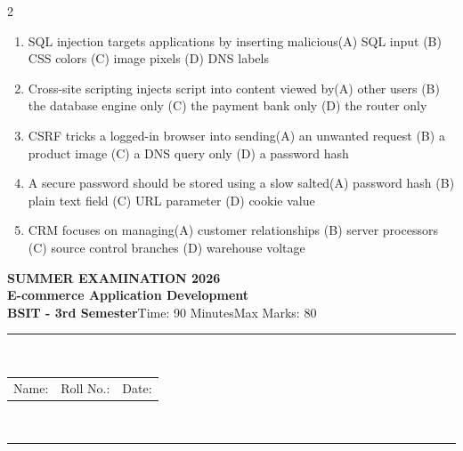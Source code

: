 \documentclass[a4paper]{article}
\makeatletter
\newcommand{\examheader}{%
\begin{center}\textbf{\large SUMMER EXAMINATION 2026}\\[-1pt]
\textbf{\normalsize E-commerce Application Development}\\[-1pt]
\textbf{BSIT - 3rd Semester}\quad Time: 90 Minutes\quad Max Marks: 80\\[-1pt]
\textcolor{black!65}{\rule{\linewidth}{0.45pt}}\\[-2pt]
\begin{tabularx}{\linewidth}{@{}X X X@{}}Name: \hrulefill & Roll No.: \hrulefill & Date: \hrulefill\end{tabularx}\\[-1pt]
\textcolor{black!65}{\rule{\linewidth}{0.45pt}}\end{center}}
\makeatother
\begin{document}
\begin{multicols*}{2}
\begin{enumerate}
\item SQL injection targets applications by inserting malicious\newline\hspace*{0.6em}(A) SQL input \quad (B) CSS colors \newline\hspace*{0.6em}(C) image pixels \quad (D) DNS labels
\item Cross-site scripting injects script into content viewed by\newline\hspace*{0.6em}(A) other users \quad (B) the database engine only \newline\hspace*{0.6em}(C) the payment bank only \quad (D) the router only
\item CSRF tricks a logged-in browser into sending\newline\hspace*{0.6em}(A) an unwanted request \quad (B) a product image \newline\hspace*{0.6em}(C) a DNS query only \quad (D) a password hash
\item A secure password should be stored using a slow salted\newline\hspace*{0.6em}(A) password hash \quad (B) plain text field \newline\hspace*{0.6em}(C) URL parameter \quad (D) cookie value
\item CRM focuses on managing\newline\hspace*{0.6em}(A) customer relationships \quad (B) server processors \newline\hspace*{0.6em}(C) source control branches \quad (D) warehouse voltage
\end{enumerate}
\end{multicols*}
\newpage
\examheader
\raggedcolumns
\end{document}
